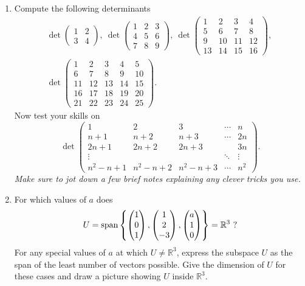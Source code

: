 \begin{enumerate}
\item
Compute the following determinants
\begin{gather*}
\det\begin{pmatrix}1&2\\3&4
\end{pmatrix},\:
\det\begin{pmatrix}1&2&3\\4&5&6\\7&8&9
\end{pmatrix},\:
\det\begin{pmatrix}1&2&3&4\\5&6&7&8\\9&10&11&12\\13&14&15&16
\end{pmatrix} ,\:\\
\det\begin{pmatrix}1&2&3&4&5\\6&7&8&9&10\\11&12&13&14&15\\
16&17&18&19&20\\21&22&23&24&25
\end{pmatrix}.
\end{gather*}
Now test your skills on
\[
\det\left(\begin{array}{ccccc}1&2&3&\cdots&n\\n+1&n+2&n+3&\cdots&2n\\2n+1&2n+2&2n+3&&3n \\
\vdots&&&\ddots&\vdots\\n^2-n+1&n^2-n+2&n^2-n+3&\cdots&n^2
\end{array}\right).
\]
{\itshape Make sure to jot down a few brief notes explaining any clever tricks you use.}

\item
For which values of $a$ does \[U={\rm span} \left\{
\begin{pmatrix}1\\0\\1\end{pmatrix},\begin{pmatrix}1\\2\\-3\end{pmatrix},\begin{pmatrix}a\\1\\0\end{pmatrix}\right\}={\mathbb R}^3\ ?\]
 For any special values of $a$ at which $U\neq{\mathbb R}^3$, express the subspace $U$ as the span of the least number of vectors possible. Give the dimension of $U$ for these cases and
 draw a picture showing $U$ inside ${\mathbb R}^3$.


\end{enumerate}
